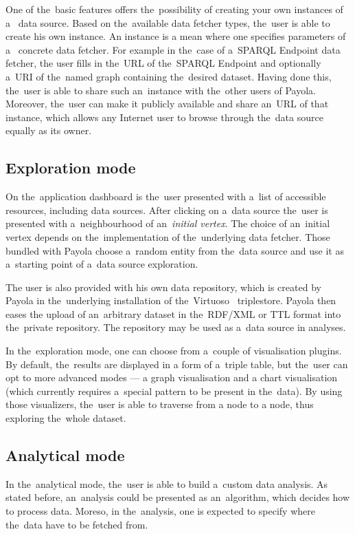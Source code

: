 One of the~basic features offers the~possibility of creating your own instances of a~
data source. Based on the~available data fetcher types, the~user is able to create 
his own instance. An instance is a mean where one specifies parameters of a~
concrete data fetcher. For example in the~case of a~SPARQL Endpoint data fetcher,
the user fills in the~URL of the~SPARQL Endpoint and optionally a~URI of the~named graph 
containing the~desired dataset. Having done this, the~user is able to share 
such an~instance with the~other users of Payola.
Moreover, the~user can make it 
publicly available and share an~URL of that instance, which allows any 
Internet user to browse through the~data source equally as its owner.

\subsection{Exploration mode}
On the~application dashboard is the~user presented with a~list of accessible 
resources, including data sources. After clicking on a~data source the~user is
presented with a~neighbourhood of an~\emph{initial vertex}. The choice of an~initial vertex
depends on the~implementation of the~underlying data fetcher.
Those bundled with Payola choose a~random entity from the~data source
and use it as a~starting point of a~data source exploration.

The user is also provided with his own data repository, which is created by 
Payola in the~underlying installation of the~Virtuoso~\cite{virtuoso} triplestore. Payola then eases 
the upload of an~arbitrary dataset in the~RDF/XML or TTL 
format into the~private repository. The repository may be used as a~data source in analyses.

In the~exploration mode, one can choose from a~couple of visualisation plugins. 
By default, the~results are displayed in a form of a~triple table, but the~user can 
opt to more advanced modes --- a graph visualisation and a chart visualisation
(which currently requires a~special pattern to be present in the~data). By using those 
visualizers, the~user is able to traverse from a node to a node, thus exploring the~whole 
dataset.

\subsection{Analytical mode}
In the~analytical mode, the~user is able to build a~custom data analysis. As 
stated before, an~analysis could be presented as an~algorithm, which decides 
how to process data. Moreso, in the~analysis, one is expected to specify 
where the~data have to be fetched from.

